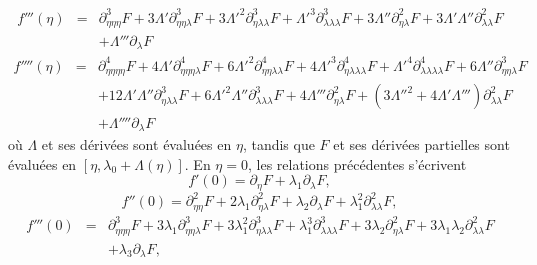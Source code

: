 \documentclass{article}
\newcommand{\nocomma}{}
\newcommand{\nosymbol}{}
\begin{document}
\begin{eqnarray}
  \label{eq20211112173223} f''' (\eta) & = & \partial_{\eta \nocomma \eta
  \nocomma \eta}^3 F + 3 \Lambda' \partial_{\eta \nocomma \eta \nocomma
  \lambda}^3 {F + 3 \Lambda'}^2 \partial_{\eta \nocomma \lambda \nocomma
  \lambda}^3 {F + \Lambda'}^3 \partial_{\lambda \nocomma \lambda \nocomma
  \lambda}^3 F + 3 \Lambda'' \partial_{\eta \nocomma \lambda}^2 F + 3 \Lambda'
  \Lambda'' \partial_{\lambda \nocomma \lambda}^2 F \nonumber\\
  &  & \nosymbol + \Lambda''' \partial_{\lambda} F
\end{eqnarray}
\begin{eqnarray}
  f'''' (\eta) & = & \partial_{\eta \nocomma \eta \nocomma \eta \nocomma
  \eta}^4 F + 4 \Lambda' \partial_{\eta \nocomma \eta \nocomma \eta \nocomma
  \lambda}^4 {F + 6 \Lambda'}^2 \partial_{\eta \nocomma \eta \nocomma \lambda
  \nocomma \lambda}^4 {F + 4 \Lambda'}^3 \partial_{\eta \nocomma \lambda
  \nocomma \lambda \nocomma \lambda}^4 {F + \Lambda'}^4 \partial_{\lambda
  \nocomma \lambda \nocomma \lambda \nocomma \lambda}^4 F + 6 \Lambda''
  \partial_{\eta \nocomma \eta \nocomma \lambda}^3 F \nonumber\\
  &  & + 12 \Lambda' \Lambda'' \partial_{\eta \nocomma \lambda \nocomma
  \lambda}^3 {F + 6 \Lambda'}^2 \Lambda'' \partial_{\lambda \nocomma \lambda
  \nocomma \lambda}^3 F + 4 \Lambda''' \partial_{\eta \nocomma \lambda}^2 F +
  \left( {3 \Lambda''}^2 + 4 \Lambda' \Lambda''' \right) \partial_{\lambda
  \nocomma \lambda}^2 F \\
  &  & + \Lambda'''' \partial_{\lambda} F
\end{eqnarray}
o{\`u} $\Lambda$ et ses d{\'e}riv{\'e}es sont {\'e}valu{\'e}es en $\eta$,
tandis que $F$ et ses d{\'e}riv{\'e}es partielles sont {\'e}valu{\'e}es en
$[\eta, \lambda_0 + \Lambda (\eta)]$. En $\eta = 0$, les relations
pr{\'e}c{\'e}dentes s'{\'e}crivent
\begin{equation}
  \label{eq20220107060454} f' (0) = \partial_{\eta} F + \lambda_1
  \partial_{\lambda} F,
\end{equation}
\begin{equation}
  \label{eq20220107124311} f'' (0) = \partial_{\eta \nocomma \eta}^2 F + 2
  \lambda_1 \partial_{\eta \nocomma \lambda}^2 F + \lambda_2
  \partial_{\lambda} F + \lambda_1^2 \partial_{\lambda \nocomma \lambda}^2 F,
\end{equation}
\begin{eqnarray}
  f''' (0) & = & \partial_{\eta \nocomma \eta \nocomma \eta}^3 F + 3 \lambda_1
  \partial_{\eta \nocomma \eta \nocomma \lambda}^3 F + 3 \lambda_1^2
  \partial_{\eta \nocomma \lambda \nocomma \lambda}^3 F + \lambda_1^3
  \partial_{\lambda \nocomma \lambda \nocomma \lambda}^3 F + 3 \lambda_2
  \partial_{\eta \nocomma \lambda}^2 F + 3 \lambda_1 \lambda_2
  \partial_{\lambda \nocomma \lambda}^2 F \nonumber\\
  &  & \nosymbol + \lambda_3 \partial_{\lambda} F,  \label{eq20220107060500}
\end{eqnarray}
\end{document}
